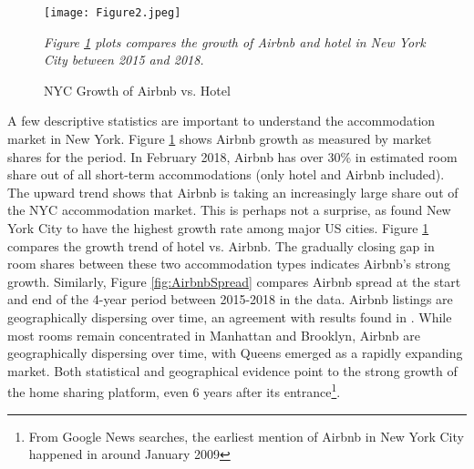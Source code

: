 \documentclass[12pt]{article}
\begin{document}
		\begin{figure}[!htb] %
			\begin{center}
				\caption{NYC Growth of Airbnb vs. Hotel}
				\label{fig:AirbnbvsHotelGrowth}
				\texttt{[image: Figure2.jpeg]}
			\end{center}
			\vspace{-.2in}
			\emph{Figure \ref{fig:AirbnbvsHotelGrowth} plots compares the growth of Airbnb and hotel in New York City between 2015 and 2018.}
		\end{figure}

			\par
			A few descriptive statistics are important to understand the accommodation market in New York. Figure \ref{fig:AirbnbvsHotelGrowth} shows Airbnb growth as measured by market shares for the period. In February 2018, Airbnb has over 30\% in estimated room share out of all short-term accommodations (only hotel and Airbnb included). The upward trend shows that Airbnb is taking an increasingly large share out of the NYC accommodation market. This is perhaps not a surprise, as \citet{farronato2018welfare} found New York City to have the highest growth rate among major US cities. Figure \ref{fig:AirbnbvsHotelGrowth} compares the growth trend of hotel vs. Airbnb. The gradually closing gap in room shares between these two accommodation types indicates Airbnb's strong growth. Similarly, Figure \ref{fig:AirbnbSpread} compares Airbnb spread at the start and end of the 4-year period between 2015-2018 in the data. Airbnb listings are geographically dispersing over time, an agreement with results found in \citet{coles2017airbnb}. While most rooms remain concentrated in Manhattan and Brooklyn, Airbnb are geographically dispersing over time, with Queens emerged as a rapidly expanding market. Both statistical and geographical evidence point to the strong growth of the home sharing platform, even 6 years after its entrance\footnote{From Google News searches, the earliest mention of Airbnb in New York City happened in around January 2009}.
\end{document}
